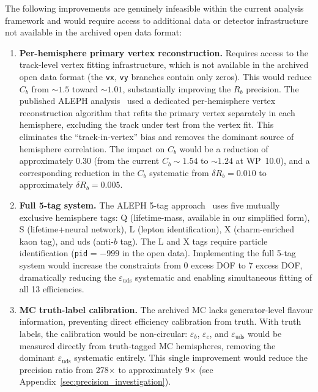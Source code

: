 \documentclass[11pt,a4paper]{article}
\begin{document}
The following improvements are genuinely infeasible within the current analysis
framework and would require access to additional data or detector infrastructure
not available in the archived open data format:

\begin{enumerate}
\item \textbf{Per-hemisphere primary vertex reconstruction.} Requires access to the
track-level vertex fitting infrastructure, which is not available in the archived
open data format (the \texttt{vx}, \texttt{vy} branches contain only zeros). This
would reduce $C_b$ from $\sim 1.5$ toward $\sim 1.01$, substantially improving the
$R_b$ precision. The published ALEPH analysis~\cite{ALEPH:Rb:1996} used a dedicated
per-hemisphere vertex reconstruction algorithm that refits the primary vertex
separately in each hemisphere, excluding the track under test from the vertex fit.
This eliminates the ``track-in-vertex'' bias and removes the dominant source of
hemisphere correlation. The impact on $C_b$ would be a reduction of approximately
0.30 (from the current $C_b \sim 1.54$ to $\sim 1.24$ at WP~10.0), and a corresponding
reduction in the $C_b$ systematic from $\delta R_b = 0.010$ to approximately
$\delta R_b = 0.005$.

\item \textbf{Full 5-tag system.} The ALEPH 5-tag approach~\cite{ALEPH:Rb:1996}
uses five mutually exclusive hemisphere tags: Q (lifetime-mass, available in our
simplified form), S (lifetime+neural network), L (lepton identification), X
(charm-enriched kaon tag), and uds (anti-$b$ tag). The L and X tags require
particle identification (\texttt{pid} = $-999$ in the open data). Implementing the
full 5-tag system would increase the constraints from 0 excess DOF to 7 excess DOF,
dramatically reducing the $\varepsilon_\mathrm{uds}$ systematic and enabling
simultaneous fitting of all 13 efficiencies.

\item \textbf{MC truth-label calibration.} The archived MC lacks generator-level
flavour information, preventing direct efficiency calibration from truth. With truth
labels, the calibration would be non-circular: $\varepsilon_b$, $\varepsilon_c$, and
$\varepsilon_\mathrm{uds}$ would be measured directly from truth-tagged MC
hemispheres, removing the dominant $\varepsilon_\mathrm{uds}$ systematic entirely.
This single improvement would reduce the precision ratio from 278$\times$ to
approximately 9$\times$ (see Appendix~\ref{sec:precision_investigation}).


\end{enumerate}
\end{document}
